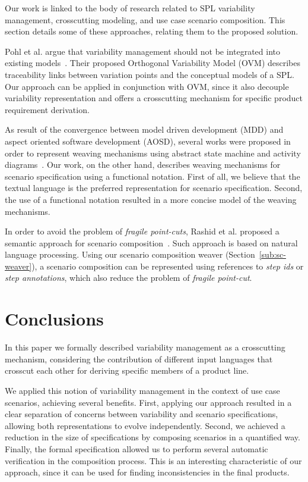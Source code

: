 \documentclass{acm_proc_article-sp}
\begin{document}
Our work is linked to the body of research related to SPL
variability management, crosscutting modeling, and use case scenario
composition. This section details some of these approaches, relating
them to the proposed solution.

Pohl et al. argue that variability management should not be
integrated into existing models~\cite{phol-spl-book}. Their proposed
Orthogonal Variability Model (OVM) describes traceability links
between variation points and the conceptual models of a SPL. Our
approach can be applied in conjunction with OVM, since it also
decouple variability representation and offers a crosscutting
mechanism for specific product requirement derivation.

As result of the convergence between model driven development (MDD)
and aspect oriented software development (AOSD), several works were
proposed in order to represent weaving mechanisms using abstract
state machine and activity
diagrams~\cite{noda-aom-2006,thomas-aom-2006}. Our work, on the
other hand, describes weaving mechanisms for scenario specification
using a functional notation. First of all, we believe that the
textual language is the preferred representation for scenario
specification. Second, the use of a functional notation resulted in
a more concise model of the weaving mechanisms.

In order to avoid the problem of \emph{fragile point-cuts}, Rashid
et al. proposed a semantic approach for scenario
composition~\cite{rashid-aosd-2007}. Such approach is based on
natural language processing. Using our scenario composition weaver
(Section~\ref{sub:sc-weaver}), a scenario composition can be
represented using references to \emph{step ids} or \emph{step annotations}, 
which also reduce the problem of \emph{fragile point-cut}.

\section{Conclusions}\label{sec:conclusions}

In this paper we formally described variability management as a 
crosscutting mechanism, considering the contribution 
of different input languages that crosscut each other for deriving 
specific members of a product line. 

We applied this notion of variability management in the context of use 
case scenarios, achieving several benefits. First, applying our approach resulted in 
a clear separation of concerns between variability and scenario specifications, 
allowing both representations to evolve independently. Second, we achieved a reduction 
in the size of specifications by composing scenarios in a quantified way. Finally, the 
formal specification allowed us to perform several automatic verification in the composition 
process. This is an interesting characteristic of our approach, since it can be used 
for finding inconsistencies in the final products.
\end{document}
